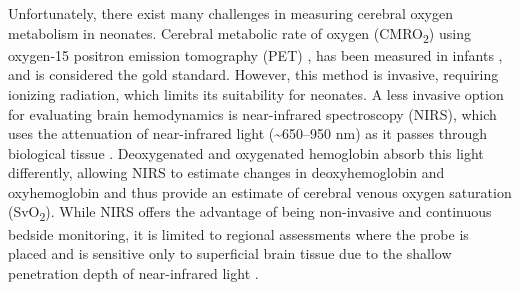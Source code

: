 \documentclass[
true
]{sn-jnl}
\begin{document}
Unfortunately, there exist many challenges in measuring cerebral oxygen
metabolism in neonates. Cerebral metabolic rate of oxygen
(CMRO\textsubscript{2}) using oxygen-15 positron emission tomography
(PET) \citep{mintunBrainOxygenUtilization1984}, has been measured in
infants \citep{altmanCerebralBloodFlow1988}, and is considered the gold
standard. However, this method is invasive, requiring ionizing
radiation, which limits its suitability for neonates. A less invasive
option for evaluating brain hemodynamics is near-infrared spectroscopy
(NIRS), which uses the attenuation of near-infrared light
(\textasciitilde650--950 nm) as it passes through biological tissue
\citep{skovEstimationCerebralVenous1993}. Deoxygenated and oxygenated
hemoglobin absorb this light differently, allowing NIRS to estimate
changes in deoxyhemoglobin and oxyhemoglobin
\citep{wrayCharacterizationInfraredAbsorption1988} and thus provide an
estimate of cerebral venous oxygen saturation (SvO\textsubscript{2}).
While NIRS offers the advantage of being non-invasive and continuous
bedside monitoring, it is limited to regional assessments where the
probe is placed and is sensitive only to superficial brain tissue due to
the shallow penetration depth of near-infrared light
\citep{boasDiffuseOpticalImaging2004}.
\end{document}
